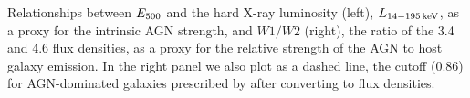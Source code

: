 \label{fig:excess_vs_agn} Relationships between $E_{\rm 500}$ and the hard X-ray luminosity (left), $L_{\rm 14-195\,keV}$, as a proxy for the intrinsic AGN strength, and $W1/W2$ (right), the ratio of the 3.4 and 4.6 \um{} flux densities, as a proxy for the relative strength of the AGN to host galaxy emission. In the right panel we also plot as a dashed line, the cutoff (0.86) for AGN-dominated galaxies prescribed by \citet{Stern:2012mz} after converting to flux densities.
  
  
  